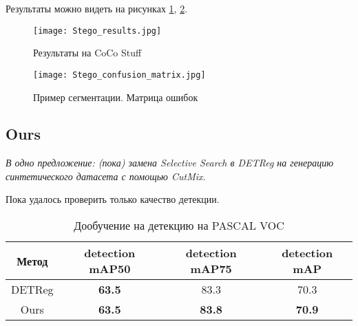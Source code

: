     
    Результаты можно видеть на рисунках \ref{fig:stego_results}, \ref{fig:stego_confusion_matrix}.
    \begin{figure}
        \centering
        \texttt{[image: Stego\_results.jpg]}
        \caption{Результаты на CoCo Stuff\label{fig:stego_results}}
    \end{figure}

    \begin{figure}
        \centering
        \texttt{[image: Stego\_confusion\_matrix.jpg]}
        \caption{Пример сегментации. Матрица ошибок\label{fig:stego_confusion_matrix}}
    \end{figure}

    \FloatBarrier
\subsection{Ours}
    \textit{В одно предложение: (пока) замена Selective Search в DETReg на генерацию синтетического датасета с помощью CutMix.}

    Пока удалось проверить только качество детекции.
    \begin{table}
        \caption{Дообучение на детекцию на PASCAL VOC\label{table:ours}}
        \begin{center}
            \begin{tabular}{c c c c}
                \hline
                Метод & detection mAP50 & detection mAP75 & detection mAP \\
                \hline \hline
                DETReg & \textbf{63.5} & 83.3 & 70.3 \\
                Ours & \textbf{63.5} & \textbf{83.8} & \textbf{70.9} \\
                \hline
            \end{tabular}
        \end{center}
    \end{table}